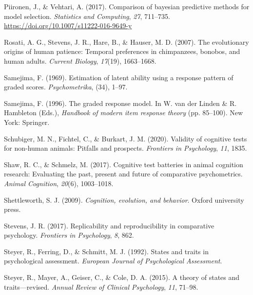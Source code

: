 \documentclass[
  man,floatsintext]{apa6}
\newlength{\cslhangindent}
\newlength{\cslentryspacingunit} %
\newenvironment{CSLReferences}[2] %
 {%
  \setlength{\parindent}{0pt}
  \ifodd #1
  \let\oldpar\par
  \def\par{\hangindent=\cslhangindent\oldpar}
  \fi
  \setlength{\parskip}{#2\cslentryspacingunit}
 }%
 {}
\begin{document}
\begin{CSLReferences}{1}{0}
\leavevmode{}%
Piironen, J., \& Vehtari, A. (2017). Comparison of bayesian predictive methods for model selection. \emph{Statistics and Computing}, \emph{27}, 711--735. \url{https://doi.org/10.1007/s11222-016-9649-y}

\leavevmode{}%
Rosati, A. G., Stevens, J. R., Hare, B., \& Hauser, M. D. (2007). The evolutionary origins of human patience: Temporal preferences in chimpanzees, bonobos, and human adults. \emph{Current Biology}, \emph{17}(19), 1663--1668.

\leavevmode{}%
Samejima, F. (1969). Estimation of latent ability using a response pattern of graded scores. \emph{Psychometrika}, (34), 1--97.

\leavevmode{}%
Samejima, F. (1996). The graded response model. In W. van der Linden \& R. Hambleton (Eds.), \emph{Handbook of modern item response theory} (pp. 85--100). New York: Springer.

\leavevmode{}%
Schubiger, M. N., Fichtel, C., \& Burkart, J. M. (2020). Validity of cognitive tests for non-human animals: Pitfalls and prospects. \emph{Frontiers in Psychology}, \emph{11}, 1835.

\leavevmode{}%
Shaw, R. C., \& Schmelz, M. (2017). Cognitive test batteries in animal cognition research: Evaluating the past, present and future of comparative psychometrics. \emph{Animal Cognition}, \emph{20}(6), 1003--1018.

\leavevmode{}%
Shettleworth, S. J. (2009). \emph{Cognition, evolution, and behavior}. Oxford university press.

\leavevmode{}%
Stevens, J. R. (2017). Replicability and reproducibility in comparative psychology. \emph{Frontiers in Psychology}, \emph{8}, 862.

\leavevmode{}%
Steyer, R., Ferring, D., \& Schmitt, M. J. (1992). States and traits in psychological assessment. \emph{European Journal of Psychological Assessment}.

\leavevmode{}%
Steyer, R., Mayer, A., Geiser, C., \& Cole, D. A. (2015). A theory of states and traits---revised. \emph{Annual Review of Clinical Psychology}, \emph{11}, 71--98.


\end{CSLReferences}
\end{document}
